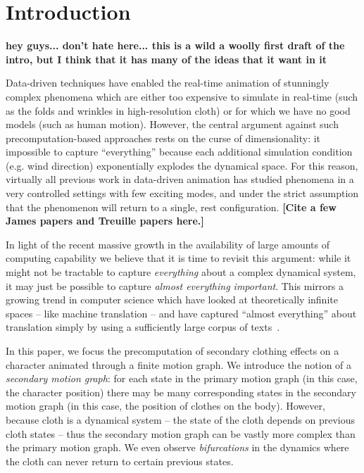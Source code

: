 \section{Introduction}


\textbf{hey guys... don't hate here... this is a wild a woolly first draft of the intro, but I think that it has many of the ideas that it want in it}

Data-driven techniques have enabled the real-time animation of stunningly complex phenomena which are either too expensive to simulate in real-time (such as the folds and wrinkles in high-resolution cloth) or for which we have no good models (such as human motion). However, the central argument against such precomputation-based approaches rests on the curse of dimensionality: it impossible to capture ``everything'' because each additional simulation condition (e.g. wind direction) exponentially explodes the dynamical space. For this reason, virtually all previous work in data-driven animation has studied phenomena in a very controlled settings with few exciting modes, and under the strict assumption that the phenomenon will return to a single, rest configuration. \textbf{[Cite a few James papers and Treuille papers here.]}

In light of the recent massive growth in the availability of large amounts of computing capability we believe that it is time to revisit this argument: while it might not be tractable to capture \emph{everything} about a complex dynamical system, it may just be possible to capture \emph{almost everything important}. This mirrors a growing trend in computer science which have looked at theoretically infinite spaces -- like machine translation -- and have captured ``almost everything'' about translation simply by using a sufficiently large corpus of texts~\cite{Halevy:2009}.

In this paper, we focus the precomputation of secondary clothing effects on a character animated through a finite motion graph. We introduce the notion of a \emph{secondary motion graph}: for each state in the primary motion graph (in this case, the character position) there may be many corresponding states in the secondary motion graph (in this case, the position of clothes on the body). However, because cloth is a dynamical system -- the state of the cloth depends on previous cloth states -- thus the secondary motion graph can be vastly more complex than the primary motion graph. We even observe \emph{bifurcations} in the dynamics where the cloth can never return to certain previous states.


